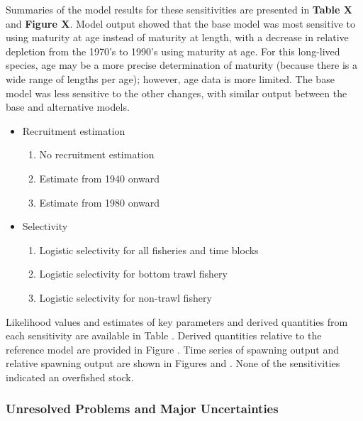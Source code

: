 \documentclass[
]{scrartcl}
\providecommand{\tightlist}{%
  \setlength{\itemsep}{0pt}\setlength{\parskip}{0pt}}\usepackage{longtable,booktabs,array}
\begin{document}
Summaries of the model results for these sensitivities are presented in
\textbf{Table X} and \textbf{Figure X}. Model output showed that the
base model was most sensitive to using maturity at age instead of
maturity at length, with a decrease in relative depletion from the
1970's to 1990's using maturity at age. For this long-lived species, age
may be a more precise determination of maturity (because there is a wide
range of lengths per age); however, age data is more limited. The base
model was less sensitive to the other changes, with similar output
between the base and alternative models.

\begin{itemize}
\item
  Recruitment estimation

  \begin{enumerate}
  \def\labelenumi{\arabic{enumi}.}
  \setcounter{enumi}{12}
  \tightlist
  \item
    No recruitment estimation
  \item
    Estimate from 1940 onward
  \item
    Estimate from 1980 onward
  \end{enumerate}
\item
  Selectivity

  \begin{enumerate}
  \def\labelenumi{\arabic{enumi}.}
  \setcounter{enumi}{15}
  \tightlist
  \item
    Logistic selectivity for all fisheries and time blocks
  \item
    Logistic selectivity for bottom trawl fishery
  \item
    Logistic selectivity for non-trawl fishery
  \end{enumerate}
\end{itemize}

Likelihood values and estimates of key parameters and derived quantities
from each sensitivity are available in Table . Derived quantities
relative to the reference model are provided in Figure . Time series of
spawning output and relative spawning output are shown in Figures and .
None of the sensitivities indicated an overfished stock.

\subsubsection{Unresolved Problems and Major
Uncertainties}\label{unresolved-problems-and-major-uncertainties-1}
\end{document}
